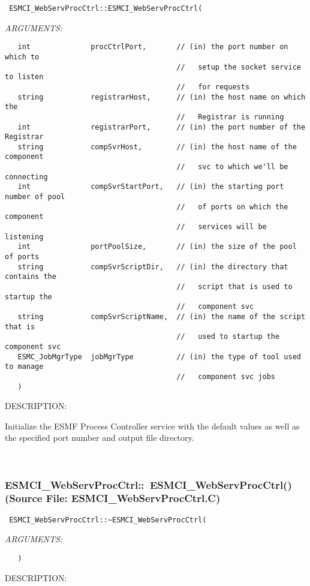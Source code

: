   
\begin{verbatim} ESMCI_WebServProcCtrl::ESMCI_WebServProcCtrl(\end{verbatim}{\em ARGUMENTS:}
\begin{verbatim}   int              procCtrlPort,       // (in) the port number on which to
                                        //   setup the socket service to listen
                                        //   for requests
   string           registrarHost,      // (in) the host name on which the
                                        //   Registrar is running
   int              registrarPort,      // (in) the port number of the Registrar
   string           compSvrHost,        // (in) the host name of the component
                                        //   svc to which we'll be connecting
   int              compSvrStartPort,   // (in) the starting port number of pool
                                        //   of ports on which the component
                                        //   services will be listening
   int              portPoolSize,       // (in) the size of the pool of ports
   string           compSvrScriptDir,   // (in) the directory that contains the
                                        //   script that is used to startup the
                                        //   component svc
   string           compSvrScriptName,  // (in) the name of the script that is
                                        //   used to startup the component svc
   ESMC_JobMgrType  jobMgrType          // (in) the type of tool used to manage
                                        //   component svc jobs
   )\end{verbatim}
{\sf DESCRIPTION:\\ }


      Initialize the ESMF Process Controller service with the default values
      as well as the specified port number and output file directory.
   
 
\mbox{}\hrulefill\
 
\subsubsection{ESMCI\_WebServProcCtrl::~ESMCI\_WebServProcCtrl() (Source File: ESMCI\_WebServProcCtrl.C)}


  
\begin{verbatim} ESMCI_WebServProcCtrl::~ESMCI_WebServProcCtrl(\end{verbatim}{\em ARGUMENTS:}
\begin{verbatim}   )\end{verbatim}
{\sf DESCRIPTION:\\ }


